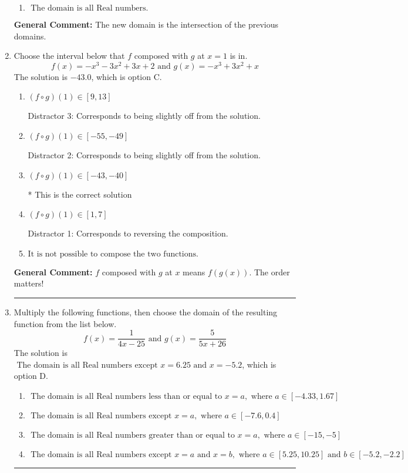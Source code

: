 \documentclass{extbook}[14pt]
\newcommand{\litem}[1]{\item #1

\rule{\textwidth}{0.4pt}}
\begin{document}
\begin{enumerate}
{\begin{enumerate}[label=\Alph*.]
\item \( \text{ The domain is all Real numbers. } \)


\end{enumerate}

\textbf{General Comment:} The new domain is the intersection of the previous domains.
}
\litem{
Choose the interval below that $f$ composed with $g$ at $x=1$ is in.
\[ f(x) = -x^{3} -3 x^{2} +3 x + 2 \text{ and } g(x) = -x^{3} +3 x^{2} +x \]
The solution is \( -43.0 \), which is option C.\begin{enumerate}[label=\Alph*.]
\item \( (f \circ g)(1) \in [9, 13] \)

 Distractor 3: Corresponds to being slightly off from the solution.
\item \( (f \circ g)(1) \in [-55, -49] \)

 Distractor 2: Corresponds to being slightly off from the solution.
\item \( (f \circ g)(1) \in [-43, -40] \)

* This is the correct solution
\item \( (f \circ g)(1) \in [1, 7] \)

 Distractor 1: Corresponds to reversing the composition.
\item \( \text{It is not possible to compose the two functions.} \)


\end{enumerate}

\textbf{General Comment:} $f$ composed with $g$ at $x$ means $f(g(x))$. The order matters!
}
\litem{
Multiply the following functions, then choose the domain of the resulting function from the list below.
\[ f(x) = \frac{1}{4x-25} \text{ and } g(x) = \frac{5}{5x+26} \]
The solution is \( \text{ The domain is all Real numbers except } x = 6.25 \text{ and } x = -5.2 \), which is option D.\begin{enumerate}[label=\Alph*.]
\item \( \text{ The domain is all Real numbers less than or equal to } x = a, \text{ where } a \in [-4.33, 1.67] \)


\item \( \text{ The domain is all Real numbers except } x = a, \text{ where } a \in [-7.6, 0.4] \)


\item \( \text{ The domain is all Real numbers greater than or equal to } x = a, \text{ where } a \in [-15, -5] \)


\item \( \text{ The domain is all Real numbers except } x = a \text{ and } x = b, \text{ where } a \in [5.25, 10.25] \text{ and } b \in [-5.2, -2.2] \)



\end{enumerate}}
\end{enumerate}
\end{document}
